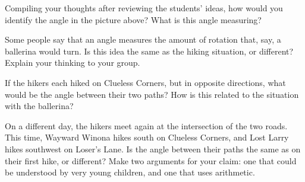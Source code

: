 \documentclass[nooutcomes,noauthor]{ximera}
\begin{document}
%
%
%



\begin{problem}
Compiling your thoughts after reviewing the students' ideas, how would you identify the angle in the picture above? What is this angle measuring?


\end{problem}

\begin{problem}
Some people say that an angle measures the amount of rotation that, say, a ballerina would turn. Is this idea the same as the hiking situation, or different? Explain your thinking to your group.

\end{problem}   

\newpage

\begin{problem}
If the hikers each hiked on Clueless Corners, but in opposite directions, what would be the angle between their two paths?  How is this related to the situation with the ballerina?

\end{problem}


\begin{problem}
On a different day, the hikers meet again at the intersection of the two roads.  This time, Wayward Winona hikes south on Clueless Corners, and Lost Larry hikes southwest on Loser's Lane.  Is the angle between their paths the same as on their first hike, or different?  Make two arguments for your claim: one that could be understood by very young children, and one that uses arithmetic.

\begin{image}  \end{image}


\end{problem}
\end{document}
